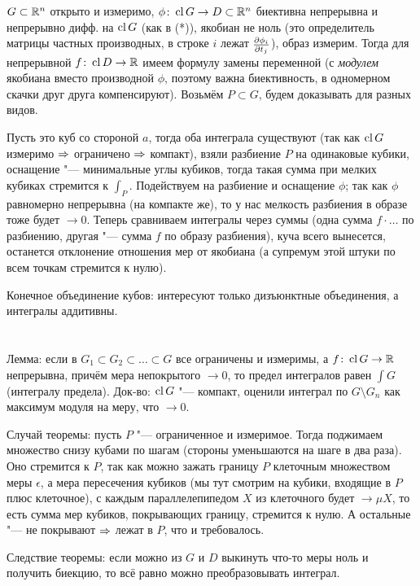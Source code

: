\section{} %
$G \subset \mathbb{R}^n$ открыто и измеримо, $\phi \colon \operatorname{cl} G \to D \subset \mathbb{R}^n$ биективна непрерывна и непрерывно дифф. на $\operatorname{cl} G$ (как в (*)), якобиан не ноль
(это определитель матрицы частных производных, в строке $i$ лежат $\frac{\partial \phi_i}{\partial t_j}$), образ измерим.
Тогда для непрерывной $f \colon \operatorname{cl} D \to \mathbb{R}$ имеем формулу замены переменной (с \textit{модулем} якобиана вместо производной $\phi$, поэтому важна биективность, в одномерном скачки друг друга компенсируют).
Возьмём $P \subset G$, будем доказывать для разных видов.

Пусть это куб со стороной $a$, тогда оба интеграла существуют (так как $\operatorname{cl} G$ измеримо $\Rightarrow$ ограничено $\Rightarrow$ компакт), взяли разбиение $P$ на одинаковые кубики, оснащение "--- минимальные углы кубиков,
тогда такая сумма при мелких кубиках стремится к $\int_P$.
Подействуем на разбиение и оснащение $\phi$; так как $\phi$ равномерно непрерывна (на компакте же), то у нас мелкость разбиения в образе тоже будет $\to 0$.
Теперь сравниваем интегралы через суммы (одна сумма $f\cdot \dots$ по разбиению, другая "--- сумма $f$ по образу разбиения), куча всего вынесется,
останется отклонение отношения мер от якобиана (а супремум этой штуки по всем точкам стремится к нулю).

Конечное объединение кубов: интересуют только дизъюнктные объединения, а интегралы аддитивны.

\section{} %
Лемма: если в $G_1\subset G_2 \subset \dots \subset G$ все ограничены и измеримы, а $f \colon \operatorname{cl} G \to \mathbb{R}$ непрерывна, причём мера непокрытого $\to 0$, то предел интегралов равен $\int G$ (интегралу предела).
Док-во: $\operatorname{cl} G$ "--- компакт, оценили интеграл по $G \setminus G_n$ как максимум модуля на меру, что $\to 0$.

Случай теоремы: пусть $P$ "--- ограниченное и измеримое.
Тогда поджимаем множество снизу кубами по шагам (стороны уменьшаются на шаге в два раза).
Оно стремится к $P$, так как можно зажать границу $P$ клеточным множеством меры $\epsilon$, а мера пересечения кубиков (мы тут смотрим на кубики, входящие в $P$ плюс клеточное),
с каждым параллелепипедом $X$ из клеточного будет $\to \mu X$, то есть сумма мер кубиков, покрывающих границу, стремится к нулю.
А остальные "--- не покрывают $\Rightarrow$ лежат в $P$, что и требовалось.

Следствие теоремы: если можно из $G$ и $D$ выкинуть что-то меры ноль и получить биекцию, то всё равно можно преобразовывать интеграл.

\section{} %
\TODO

\section{} %
\TODO
